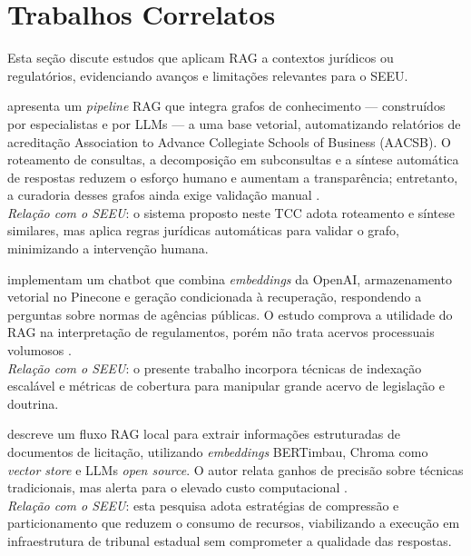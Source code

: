 
\section{Trabalhos Correlatos}
\label{sec:trabalhos-correlatos}

Esta seção discute estudos que aplicam RAG a contextos jurídicos ou
regulatórios, evidenciando avanços e limitações relevantes para o SEEU.

 apresenta um \textit{pipeline} RAG que integra
grafos de conhecimento — construídos por especialistas e por LLMs — a uma base
vetorial, automatizando relatórios de acreditação Association to Advance
Collegiate Schools of Business (AACSB). O roteamento de consultas, a
decomposição em subconsultas e a síntese automática de respostas reduzem o
esforço humano e aumentam a transparência; entretanto, a curadoria desses
grafos ainda exige validação manual \cite{edwards2024hybrid}.\\
\emph{Relação com o SEEU}: o sistema proposto neste TCC adota roteamento e
síntese similares, mas aplica regras jurídicas automáticas para validar o
grafo, minimizando a intervenção humana.

 implementam um chatbot que combina
\textit{embeddings} da OpenAI, armazenamento vetorial no Pinecone e geração
condicionada à recuperação, respondendo a perguntas sobre normas de agências
públicas. O estudo comprova a utilidade do RAG na interpretação de regulamentos,
porém não trata acervos processuais volumosos \cite{pujiono2024implementing}.\\
\emph{Relação com o SEEU}: o presente trabalho incorpora técnicas de indexação
escalável e métricas de cobertura para manipular grande acervo de legislação e
doutrina.

 descreve um fluxo RAG local para extrair
informações estruturadas de documentos de licitação, utilizando
\textit{embeddings} BERTimbau, Chroma como \textit{vector store} e LLMs
\textit{open source}. O autor relata ganhos de precisão sobre técnicas
tradicionais, mas alerta para o elevado custo computacional
\cite{aquino2024extracting}.\\
\emph{Relação com o SEEU}: esta pesquisa adota estratégias de compressão e
particionamento que reduzem o consumo de recursos, viabilizando a execução em
infraestrutura de tribunal estadual sem comprometer a qualidade das respostas.

